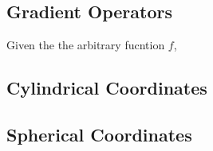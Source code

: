 \documentclass[class=report, 12pt, crop=false]{standalone}
\begin{document}
\begin{center}
\chapter{Gradient Operators}
\begin{comment}
\end{comment}
Given the the arbitrary fucntion $f$,
\begin{comment}
\end{comment}
\section{Cylindrical Coordinates}
\begin{comment}
\end{comment}
\section{Spherical Coordinates}
\begin{comment}
\end{comment}
\end{center}
\end{document}
